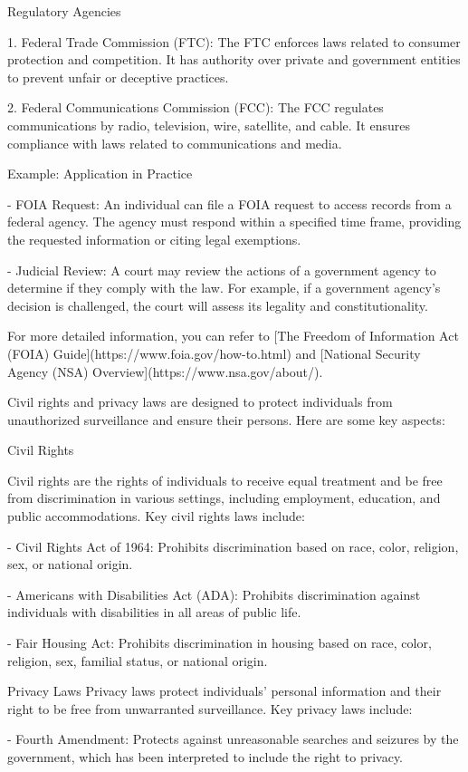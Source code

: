 \documentclass[12pt,letterpaper]{article}
\begin{document}
 Regulatory Agencies

1. Federal Trade Commission (FTC): The FTC enforces laws related to consumer protection and competition. It has authority over private and government entities to prevent unfair or deceptive practices.

2. Federal Communications Commission (FCC): The FCC regulates communications by radio, television, wire, satellite, and cable. It ensures compliance with laws related to communications and media.

 Example: Application in Practice

- FOIA Request: An individual can file a FOIA request to access records from a federal agency. The agency must respond within a specified time frame, providing the requested information or citing legal exemptions.

- Judicial Review: A court may review the actions of a government agency to determine if they comply with the law. For example, if a government agency's decision is challenged, the court will assess its legality and constitutionality.

For more detailed information, you can refer to [The Freedom of Information Act (FOIA) Guide](https://www.foia.gov/how-to.html) and [National Security Agency (NSA) Overview](https://www.nsa.gov/about/).

Civil rights and privacy laws are designed to protect individuals from unauthorized surveillance and ensure their persons. Here are some key aspects:

 Civil Rights

Civil rights are the rights of individuals to receive equal treatment and be free from discrimination in various settings, including employment, education, and public accommodations. Key civil rights laws include:

- Civil Rights Act of 1964: Prohibits discrimination based on race, color, religion, sex, or national origin.

- Americans with Disabilities Act (ADA): Prohibits discrimination against individuals with disabilities in all areas of public life.

- Fair Housing Act: Prohibits discrimination in housing based on race, color, religion, sex, familial status, or national origin.

Privacy Laws
Privacy laws protect individuals' personal information and their right to be free from unwarranted surveillance. Key privacy laws include:

- Fourth Amendment: Protects against unreasonable searches and seizures by the government, which has been interpreted to include the right to privacy.
\end{document}
